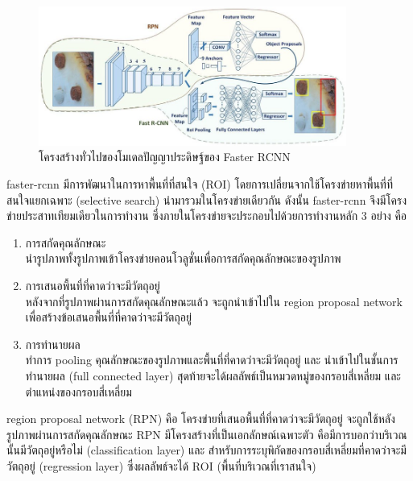 \begin{figure}[!ht]
    \centering
    \includegraphics[width=0.9\textwidth]{chapter2/images/faster_rcnn.png}
    \caption{โครงสร้างทั่วไปของโมเดลปัญญาประดิษฐ์ของ Faster RCNN}
    \label{fig:faster_rcnn_architecture}
\end{figure}
\par faster-rcnn มีการพัฒนาในการหาพื้นที่ที่สนใจ (ROI) โดยการเปลี่ยนจากใช้โครงข่ายหาพื้นที่ที่สนใจแยกเฉพาะ (selective search) นำมารวมในโครงข่ายเดียวกัน ดังนั้น faster-rcnn จึงมีโครงข่ายประสาทเทียมเดียวในการทำงาน ซึ่งภายในโครงข่ายจะประกอบไปด้วยการทำงานหลัก 3 อย่าง คือ
\begin{enumerate}
	\setlength\itemsep{-0.25em}
	\item การสกัดคุณลักษณะ
	\\	นำรูปภาพทั้งรูปภาพเข้าโครงข่ายคอนโวลูชั่นเพื่อการสกัดคุณลักษณะของรูปภาพ
	\item การเสนอพื้นที่ที่คาดว่าจะมีวัตถุอยู่
	\\	หลังจากที่รูปภาพผ่านการสกัดคุณลักษณะแล้ว จะถูกนำเข้าไปใน region proposal network เพื่อสร้างข้อเสนอพื้นที่ที่คาดว่าจะมีวัตถุอยู่
	\item การทำนายผล
	\\	ทำการ pooling คุณลักษณะของรูปภาพและพื้นที่ที่คาดว่าจะมีวัตถุอยู่ และ นำเข้าไปในชั้นการทำนายผล (full connected layer) สุดท้ายจะได้ผลลัพธ์เป็นหมวดหมู่ของกรอบสี่เหลี่ยม และ ตำแหน่งของกรอบสี่เหลี่ยม  
\end{enumerate}
\par region proposal network (RPN) คือ โครงข่ายที่เสนอพื้นที่ที่คาดว่าจะมีวัตถุอยู่ จะถูกใช้หลังรูปภาพผ่านการสกัดคุณลักษณะ RPN มีโครงสร้างที่เป็นเอกลักษณ์เฉพาะตัว
คือมีการบอกว่าบริเวณนั้นมีวัตถุอยู่หรือไม่ (classification layer) และ สำหรับการระบุพิกัดของกรอบสี่เหลี่ยมที่คาดว่าจะมีวัตถุอยู่ (regression layer) ซึ่งผลลัพธ์จะได้ ROI (พื้นที่บริเวณที่เราสนใจ)